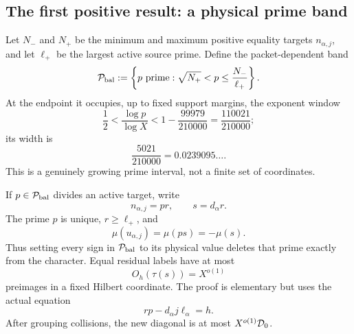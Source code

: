 \subsection{The first positive result: a physical prime band}

Let \(N_-\) and \(N_+\) be the minimum and maximum positive equality
targets \(n_{\alpha,j}\), and let \(\ell_+\) be the largest active
source prime.  Define the packet-dependent band
\begin{equation}
 \mathcal P_{\mathrm{bal}}
 :=\left\{p\text{ prime}:
   \sqrt{N_+}<p\le \frac{N_-}{\ell_+}\right\}.
 \label{eq:tpc45-intro-balanced-band}
\end{equation}
At the endpoint it occupies, up to fixed support margins, the exponent
window
\begin{equation}
 \frac12<\frac{\log p}{\log X}
 <1-\frac{99979}{210000}
 =\frac{110021}{210000};
 \label{eq:tpc45-intro-balanced-window}
\end{equation}
its width is
\begin{equation}
 \frac{5021}{210000}=0.0239095\ldots.
 \label{eq:tpc45-intro-band-width}
\end{equation}
This is a genuinely growing prime interval, not a finite set of
coordinates.

If \(p\in\mathcal P_{\mathrm{bal}}\) divides an active target, write
\begin{equation}
 n_{\alpha,j}=pr,
 \qquad s=d_\alpha r.
 \label{eq:tpc45-intro-cofactor}
\end{equation}
The prime \(p\) is unique, \(r\ge\ell_+\), and
\begin{equation}
 \mu(u_{\alpha,j})=\mu(ps)=-\mu(s).
 \label{eq:tpc45-intro-sign-collapse}
\end{equation}
Thus setting every sign in \(\mathcal P_{\mathrm{bal}}\) to its physical
value deletes that prime exactly from the character.  Equal residual
labels have at most
\begin{equation}
 O_h(\tau(s))=X^{o(1)}
 \label{eq:tpc45-intro-fiber-bound}
\end{equation}
preimages in a fixed Hilbert coordinate.  The proof is elementary but
uses the actual equation
\begin{equation}
 rp-d_\alpha j\ell_\alpha=h.
 \label{eq:tpc45-intro-determinant}
\end{equation}
After grouping collisions, the new diagonal is at most
\(X^{o(1)}\mathcal D_0\).

